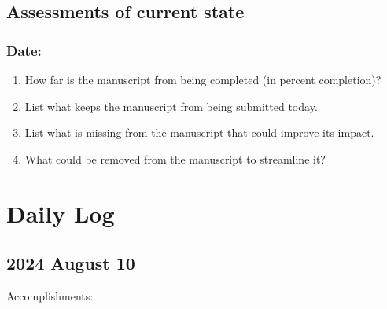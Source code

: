 \documentclass[11pt,letterpaper]{article}
\begin{document}
\subsection{Assessments of current state}
\label{sec:org6b4c6d7}



\subsubsection{Date:}
\label{sec:org62c6a4a}



\begin{enumerate}
\item How far is the manuscript from being completed (in percent completion)?
\label{sec:org7d46a35}





\item List what keeps the manuscript from being submitted today.
\label{sec:orgeff7933}





\item List what is missing from the manuscript that could improve its impact.
\label{sec:orgafb00c2}






\item What could be removed from the manuscript to streamline it?
\label{sec:org45b521c}
\end{enumerate}




\section{Daily Log}
\label{sec:org0dabfef}



\subsection{2024 August 10}
\label{sec:org2d0a63d}

Accomplishments:
\end{document}
